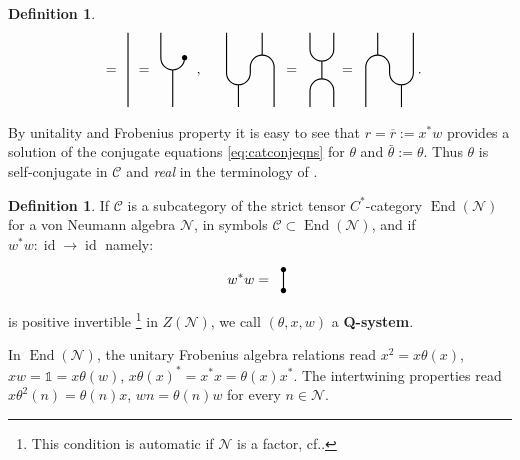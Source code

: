 \documentclass[11pt,a4paper]{article}
\makeatletter
\newcommand{\oneop}{\mathds{1}}
\newcommand{\rbar}{{\overline{r}}}
\newcommand{\C}{\mathcal{C}}
\newcommand{\N}{\mathcal{N}}
\DeclareMathOperator{\End}{End}
\DeclareMathOperator{\id}{id}
\DeclareRobustCommand{\cf}{cf.\@\xspace}
\DeclareRobustCommand{\p}{p.\@\xspace}
\newcommand{\Cstar}{$C^\ast$\@\xspace}
\theoremstyle{plain}
\theoremstyle{definition}
\newtheorem{defi}[thm]{Definition}
\theoremstyle{remark}
\numberwithin{equation}{section}%
\newcommand{\tikzmath}[2][]
     {\vcenter{\hbox{
     \begin{tikzpicture}[#1]#2
     \end{tikzpicture}}}
     }
\makeatother
\begin{document}
\begin{defi}
\begin{align}
{}\; =\, 
\tikzmath[scale=.75]{
\draw[thick] (.25,1.25) -- (.25,-1.25);
}\;\, =\,
\tikzmath[scale=.75]{
\draw[thick] (-.25,1.25) -- (-.25,.4) arc (180:360:.4) node {$\bullet$};
\draw[thick] (.15,0) -- (.15,-1.25);
}\;,\,
\quad\,
\tikzmath[scale=.75]{
\draw[thick] (-.35,1.25) -- (-.35,-.1) arc (180:360:.4) -- (.45,0);
\draw[thick] (.05,-.5) -- (.05,-1.25);
\draw[thick] (.45,0) -- (.45,0.1) arc (180:0:.4) -- (1.25,-1.25);
\draw[thick] (.85,.5) -- (.85,1.25);
}\;\; =\;
\tikzmath[scale=.75]{
\draw[thick] (-.25,1.25) -- (-.25,.7) arc (180:360:.4) -- (.55,1.25);
\draw[thick] (.15,.3) -- (.15,-.3);
\draw[thick] (-.25,-1.25) -- (-.25,-.7) arc (180:0:.4) -- (.55,-1.25);
}\; = \;
\tikzmath[scale=.75]{
\begin{scope}[xscale=-1]
\draw[thick] (-.35,1.25) -- (-.35,-.1) arc (180:360:.4) -- (.45,0);
\draw[thick] (.05,-.5) -- (.05,-1.25);
\draw[thick] (.45,0) -- (.45,0.1) arc (180:0:.4) -- (1.25,-1.25);
\draw[thick] (.85,.5) -- (.85,1.25);
\end{scope}
}\;.
\end{align}
\end{defi}

By unitality and Frobenius property it is easy to see that $r = \rbar := x^*w$ provides a solution of the conjugate equations \eqref{eq:catconjeqns} for $\theta$ and $\bar\theta := \theta$. Thus $\theta$ is self-conjugate in $\C$ and \emph{real} in the terminology of \cite{LoRo97}.

\begin{defi}\label{def:Qsys}
If $\C$ is a subcategory of the strict tensor \Cstar-category $\End(\N)$ for a von Neumann algebra $\N$, in symbols $\C \subset \End(\N)$, and if $w^*w : \id \to \id$ namely:
\begin{align}
w^*w = \! \tikzmath[scale=.75]{
\draw[thick] (.25,.35) node {$\bullet$} -- (.25,-.35) node {$\bullet$};
}
\end{align} 
is positive invertible \footnote{This condition is automatic if $\N$ is a factor, \cf \cite[\p 147]{LoRo97}.} in $Z(\N)$, we call $(\theta,x,w)$ a \textbf{Q-system}. 
\end{defi}

In $\End(\N)$, the unitary Frobenius algebra relations read $x^2 = x \theta(x)$, $xw = \oneop = x \theta(w)$, $x\theta(x)^* = x^*x = \theta(x)x^*$. The intertwining properties read $x \theta^2(n) = \theta(n) x$, $w n = \theta(n) w$ for every $n\in\N$.
\end{document}
